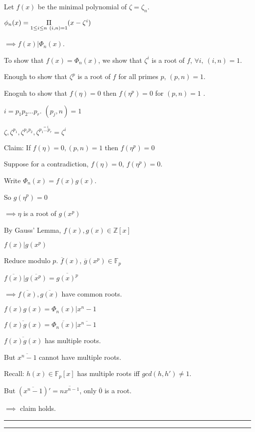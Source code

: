 \documentclass[twoside]{article}
\newcommand{\Z}{\mathbb{Z}}
\newcommand{\F}{\mathbb{F}}
\newcommand{\z}{\zeta}
\newenvironment{proof}{{\bf Proof:}}{\hfill\rule{2mm}{2mm}}
\begin{document}
\begin{proof}
    Let $f(x)$ be the minimal polynomial of $\zeta = \zeta_n$. 

    $\phi_n(x) = \underset{1 \leq i \leq n \\ \ (i,n) = 1}\Pi(x - \zeta^i)$

    $\implies f(x) \vert \Phi_n(x)$.

    To show that $f(x) = \Phi_n(x)$, we show that $\z^i$ is a root of $f$, $\forall i,\ (i,n) = 1$. 

    Enough to show that $\z^p$ is a root of $f$ for all primes $p$, $(p,n) = 1$. 

    Enoguh to show that $f(\eta) = 0 $ then $f(\eta^p) = 0$ for $(p,n) = 1$ . 

    $i = p_1p_2\dots p_r$. $(p_j, n) = 1$

    $\z, \z^{p_1}, \z^{p_1p_2}, {\z^{\overset{=i}{p_1\dots p_r}}} = \z^i$

    Claim: If $f(\eta) = 0, (p,n) = 1$ then $f(\eta^p) = 0$

    \begin{proof}
        Suppose for a contradiction, $f(\eta) = 0$, $f(\eta^p) = 0$. 

        Write $\Phi_n(x) = f(x)g(x)$. 

        So $g(\eta^p) = 0$

        $\implies \eta$ is a root of $g(x^p)$

        By Gauss' Lemma, $f(x), g(x) \in \Z[x]$

        $f(x) \vert g(x^p)$

        Reduce modulo $p$. $\overline f(x)$, $\overline g(x^p) \in \F_p$

        $\overline {f(x)} \vert \overline {g(x^p)} = \overline {g(x)^p} $

        $\implies \overline {f(x)}, \overline {g(x)}$ have common roots. 

        $f(x)g(x) = \Phi_n(x) \vert x^n - 1$

        $\overline {f(x)g(x)} = \overline{\Phi_n(x)} \vert \overline{x^n - 1}$

        $\overline {f(x)g(x)}$ has multiple roots. 

        But $\overline{x^n - 1}$ cannot have multiple roots. 

        Recall: $h(x) \in \F_p[x]$ has  multiple roots iff $gcd(h,h') \neq 1$.

        But $(\overline{x^n - 1})' = \overline{nx^{n-1}}$, only $\overline 0$ is a root. 

        $\implies $ claim holds. 

    \end{proof}
\end{proof}
\end{document}
